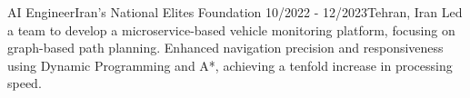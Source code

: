 \resumeSubheadingReza
{AI Engineer}{Iran's National Elites Foundation}
{10/2022 - 12/2023}{Tehran, Iran}
{Led a team to develop a microservice-based vehicle monitoring platform, focusing on graph-based path planning. Enhanced navigation precision and responsiveness using Dynamic Programming and A*, achieving a tenfold increase in processing speed.}